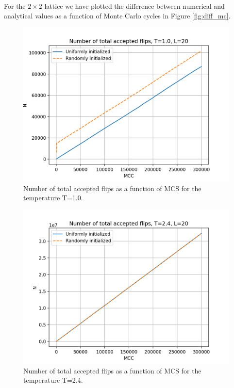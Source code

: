 \documentclass{article}
\begin{document}
\begin{multicols}{2}
For the $2\times2$ lattice we have plotted the difference between numerical and analytical values as a function of Monte Carlo cycles in Figure \ref{fig:diff_mc}. 

\begin{figure}[H]
	\centering
	\includegraphics[width=\linewidth]{n_flips_1.png}
	\caption{Number of total accepted flips as a function of MCS for the temperature T=1.0.}
	\label{fig:n1}
\end{figure}

\begin{figure}[H]
	\centering
	\includegraphics[width=\linewidth]{n_flips_24.png}
	\caption{Number of total accepted flips as a function of MCS for the temperature T=2.4.}
	\label{fig:n24}
\end{figure}


\end{multicols}
\end{document}
